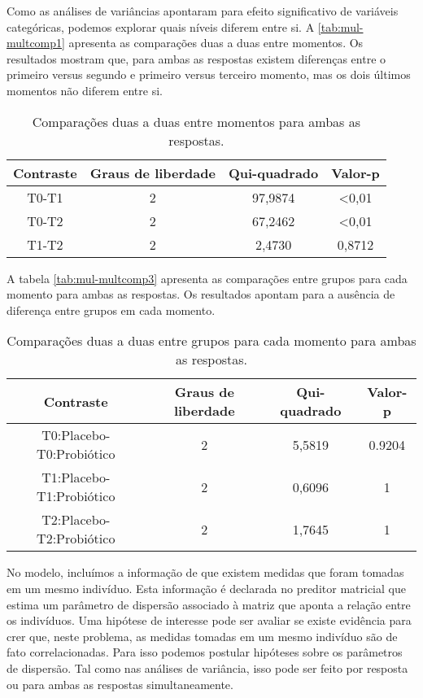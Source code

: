 Como as análises de variâncias apontaram para efeito significativo de variáveis categóricas, podemos explorar quais níveis diferem entre si. A \autoref{tab:mul-multcomp1} apresenta as comparações duas a duas entre momentos. Os resultados mostram que, para ambas as respostas existem diferenças entre o primeiro versus segundo e primeiro versus terceiro momento, mas os dois últimos momentos não diferem entre si.

\begin{table}[H]
\centering
\begin{tabular}{cccc}
\hline
Contraste & Graus de liberdade & Qui-quadrado & Valor-p        \\ \hline
T0-T1     & 2                  & 97,9874      & \textless 0,01 \\
T0-T2     & 2                  & 67,2462      & \textless 0,01 \\
T1-T2     & 2                  & 2,4730       & 0,8712         \\ \hline
\end{tabular}
\caption{Comparações duas a duas entre momentos para ambas as respostas.}
\label{tab:mul-multcomp1}
\end{table}

A tabela \autoref{tab:mul-multcomp3} apresenta as comparações entre grupos para cada momento para ambas as respostas. Os resultados apontam para a ausência de diferença entre grupos em cada momento.

\begin{table}[H]
\centering
\begin{tabular}{cccc}
\hline
Contraste                & Graus de liberdade & Qui-quadrado & Valor-p \\ \hline
T0:Placebo-T0:Probiótico & 2                  & 5,5819       & 0.9204  \\
T1:Placebo-T1:Probiótico & 2                  & 0,6096       & 1       \\
T2:Placebo-T2:Probiótico & 2                  & 1,7645       & 1       \\ \hline
\end{tabular}
\caption{Comparações duas a duas entre grupos para cada momento para ambas as respostas.}
\label{tab:mul-multcomp3}
\end{table}

No modelo, incluímos a informação de que existem medidas que foram tomadas em um mesmo indivíduo. Esta informação é declarada no preditor matricial que estima um parâmetro de dispersão associado à matriz que aponta a relação entre os indivíduos. Uma hipótese de interesse pode ser avaliar se existe evidência para crer que, neste problema, as medidas tomadas em um mesmo indivíduo são de fato correlacionadas. Para isso podemos postular hipóteses sobre os parâmetros de dispersão. Tal como nas análises de variância, isso pode ser feito por resposta ou para ambas as respostas simultaneamente.

